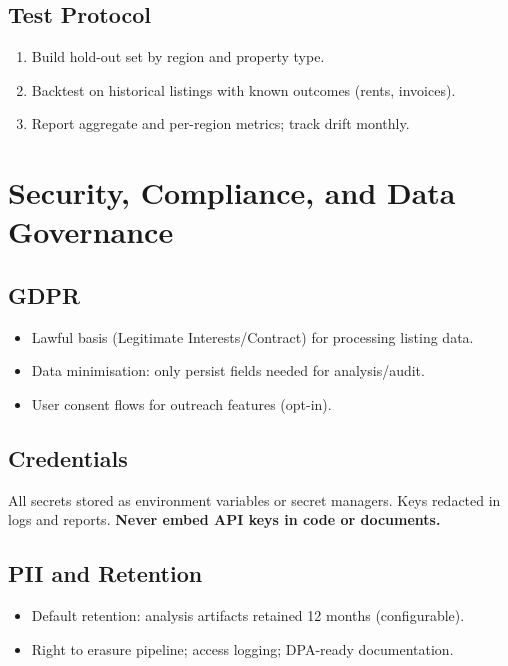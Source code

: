 \documentclass[12pt,a4paper]{article}
\begin{document}
\subsection{Test Protocol}
\begin{enumerate}[leftmargin=1.5em]
  \item Build hold-out set by region and property type.
  \item Backtest on historical listings with known outcomes (rents, invoices).
  \item Report aggregate and per-region metrics; track drift monthly.
\end{enumerate}

\section{Security, Compliance, and Data Governance}
\subsection{GDPR}
\begin{itemize}[leftmargin=1.5em]
  \item Lawful basis (Legitimate Interests/Contract) for processing listing data.
  \item Data minimisation: only persist fields needed for analysis/audit.
  \item User consent flows for outreach features (opt-in).
\end{itemize}

\subsection{Credentials}
All secrets stored as environment variables or secret managers. Keys redacted in logs and reports. \textbf{Never embed API keys in code or documents.}

\subsection{PII and Retention}
\begin{itemize}[leftmargin=1.5em]
  \item Default retention: analysis artifacts retained 12 months (configurable).
  \item Right to erasure pipeline; access logging; DPA-ready documentation.
\end{itemize}
\end{document}
